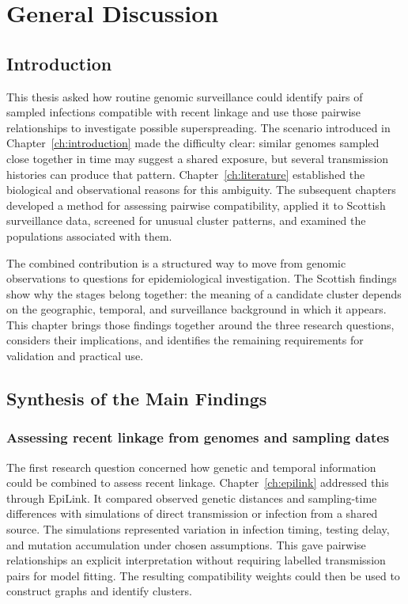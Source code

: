 \chapter{General Discussion}\label{ch:discussion}

\section{Introduction}\label{sec:ch7_introduction}

This thesis asked how routine genomic surveillance could identify pairs of sampled infections compatible with recent linkage and use those pairwise relationships to investigate possible superspreading. The scenario introduced in Chapter~\ref{ch:introduction} made the difficulty clear: similar genomes sampled close together in time may suggest a shared exposure, but several transmission histories can produce that pattern. Chapter~\ref{ch:literature} established the biological and observational reasons for this ambiguity. The subsequent chapters developed a method for assessing pairwise compatibility, applied it to Scottish surveillance data, screened for unusual cluster patterns, and examined the populations associated with them.

The combined contribution is a structured way to move from genomic observations to questions for epidemiological investigation. The Scottish findings show why the stages belong together: the meaning of a candidate cluster depends on the geographic, temporal, and surveillance background in which it appears. This chapter brings those findings together around the three research questions, considers their implications, and identifies the remaining requirements for validation and practical use.

\section{Synthesis of the Main Findings}\label{sec:ch7_synthesis}

\subsection{Assessing recent linkage from genomes and sampling dates}\label{sec:ch7_synthesis_linkage}

The first research question concerned how genetic and temporal information could be combined to assess recent linkage. Chapter~\ref{ch:epilink} addressed this through EpiLink. It compared observed genetic distances and sampling-time differences with simulations of direct transmission or infection from a shared source. The simulations represented variation in infection timing, testing delay, and mutation accumulation under chosen assumptions. This gave pairwise relationships an explicit interpretation without requiring labelled transmission pairs for model fitting. The resulting compatibility weights could then be used to construct graphs and identify clusters.

